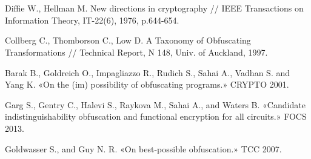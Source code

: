 \newpage
\section*{}

\begin{thebibliography}{00}

 Diffie W., Hellman M. New directions in cryptography // IEEE Transactions on
Information Theory, IT-22(6), 1976, p.644-654.

 Collberg C., Thomborson C., Low D. A Taxonomy of Obfuscating Transformations //
Technical Report, N 148, Univ. of Auckland, 1997.

  Barak B., Goldreich O., Impagliazzo R., Rudich S., Sahai A., Vadhan S. and Yang K. «On the (im) possibility of obfuscating programs.» CRYPTO 2001.

  Garg S., Gentry C., Halevi S., Raykova M., Sahai A., and Waters B. «Candidate indistinguishability obfuscation and functional encryption for all circuits.» FOCS 2013.

 Goldwasser S., and Guy N. R. «On best-possible obfuscation.» TCC 2007.


\end{thebibliography}